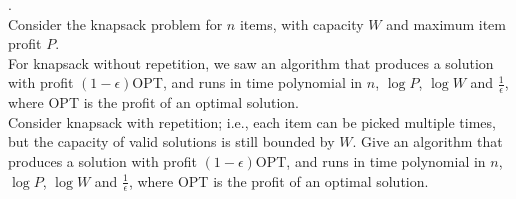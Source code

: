 \documentclass[a4paper,11pt]{article}
\begin{document}
\bigskip
{}.  \\
Consider the knapsack problem for $n$ items, with capacity $W$ and maximum item profit $P$.\\
For knapsack without repetition, we saw an algorithm that produces a solution with profit $(1- \epsilon )$OPT, 
and runs in time polynomial in $n$, $\log P$, $\log W$ and $\frac{1}{\epsilon}$, 
where OPT is the profit of an optimal solution. \\
Consider knapsack with repetition; i.e., each item can be picked multiple times, 
but the capacity of valid solutions is still bounded by $W$. 
Give an algorithm that produces a solution with profit $(1- \epsilon )$OPT, 
and runs in time polynomial in $n$, $\log P$, $\log W$ and $\frac{1}{\epsilon}$, 
where OPT is the profit of an optimal solution. \\
\end{document}
